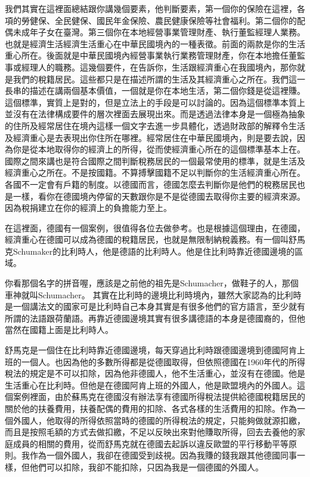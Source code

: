 \documentclass[]{ctexbook}
\begin{document}
我們其實在這裡面總結跟你講幾個要素，他判斷要素，第一個你的保險在這裡，各項的勞健保、全民健保、國民年金保險、農民健康保險等社會福利。第二個你的配偶未成年子女在臺灣。第三個你在本地經營事業管理財產、執行董監經理人業務。也就是經濟生活經濟生活重心在中華民國境內的一種表徵。前面的兩款是你的生活重心所在。後面就是中華民國境內經營事業執行業務管理財產，你在本地擔任董監事或經理人的職務。這幾個要件，在告訴你，生活跟經濟重心在我國境內，那你就是我們的稅籍居民。這些都只是在描述所謂的生活及其經濟重心之所在。我們這一長串的描述在講兩個基本價值，一個就是你在本地生活，第二個你錢是從這裡賺。這個標準，實質上是對的，但是立法上的手段是可以討論的。因為這個標準本質上並沒有在法律構成要件的層次裡面去展現出來。而是透過法律本身是一個極為抽象的住所及經常居住在境內這樣一個文字去進一步具體化，透過財政部的解釋令生活及經濟重心是去表現出你住所在哪裡。經常居住在中華民國境內，則是要去說，因為你是從本地取得你的經濟上的所得，從而使經濟重心所在的這個標準基本上在。國際之間來講也是符合國際之間判斷稅務居民的一個最常使用的標準，就是生活及經濟重心之所在。不是按國籍。不算搏擊國籍不足以判斷你的生活經濟重心所在。各國不一定會有戶籍的制度。以德國而言，德國怎麼去判斷你是他們的稅務居民也是一樣，看你在德國境內停留的天數跟你是不是從德國去取得你主要的經濟來源。因為稅捐建立在你的經濟上的負擔能力至上。

在這裡面，德國有一個案例，很值得各位去做參考。也是根據這個理由，在德國，經濟重心在德國可以成為德國的稅籍居民，也就是無限制納稅義務。有一個叫舒馬克Schumaker的比利時人，他是德語的比利時人。他是住比利時靠近德國邊境的區域。

你看那個名字的拼音喔，應該是之前他的祖先是Schumacher，做鞋子的人，那個車神就叫Schumacher。
其實在比利時的邊境比利時境內，雖然大家認為的比利時是一個講法文的國家可是比利時自己本身其實是有很多他們的官方語言，至少就有所謂的法語跟荷蘭語。再靠近德國邊境其實有很多講德語的本身是德國裔的，但他當然在國籍上面是比利時人。

舒馬克是一個住在比利時靠近德國邊境，每天穿過比利時跟德國邊境到德國阿肯上班的一個人。也因為他的多數所得都是從德國取得，但依照德國在1960年代的所得稅法的規定是不可以扣除，因為他非德國人，他不生活重心，並沒有在德國。他是生活重心在比利時。但他是在德國阿肯上班的外國人，他是歐盟境內的外國人。這個案例裡面，由於蘇馬克在德國沒有辦法享有德國所得稅法提供給德國稅籍居民的關於他的扶養費用，扶養配偶的費用的扣除、各式各樣的生活費用的扣除。作為一個外國人，他取得的所得依照當時的德國的所得稅法的規定，只能夠做就源扣繳，而且是按照毛額的方式去做扣繳，不足以反映出來對他賺取所得，回去去養他的家庭成員的相關的費用，從而舒馬克就在德國去起訴以違反歐盟的平行移動平等原則。我作為一個外國人，我卻在德國受到歧視。因為我賺的錢我跟其他德國同事一樣，但他們可以扣除，我卻不能扣除，只因為我是一個德國的外國人。
\end{document}
